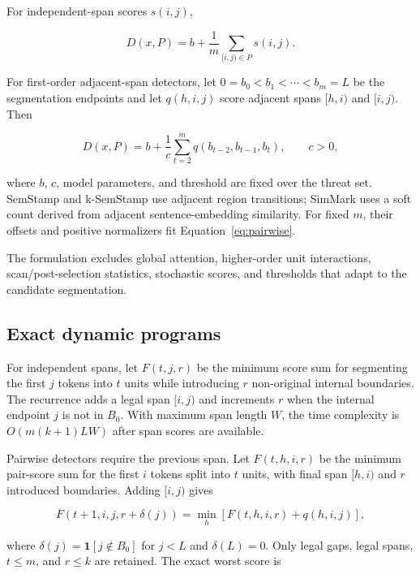 \documentclass[10pt]{article}
\begin{document}
For independent-span scores $s(i,j)$,

\begin{equation}
D(x,P)=b+\frac{1}{m}\sum_{[i,j)\in P}s(i,j).
\end{equation}

For first-order adjacent-span detectors, let
$0=b_0<b_1<\cdots<b_m=L$ be the segmentation endpoints and let
$q(h,i,j)$ score adjacent spans $[h,i)$ and $[i,j)$. Then

\begin{equation}
D(x,P)=b+\frac{1}{c}
\sum_{t=2}^{m}q(b_{t-2},b_{t-1},b_t),\qquad c>0,
\label{eq:pairwise}
\end{equation}

where $b$, $c$, model parameters, and threshold are fixed over the threat set.
SemStamp and k-SemStamp use adjacent region transitions; SimMark uses a soft
count derived from adjacent sentence-embedding similarity. For fixed $m$,
their offsets and positive normalizers fit Equation~\ref{eq:pairwise}.

The formulation excludes global attention, higher-order unit interactions,
scan/post-selection statistics, stochastic scores, and thresholds that adapt
to the candidate segmentation.

\subsection{Exact dynamic programs}

For independent spans, let $F(t,j,r)$ be the minimum score sum for segmenting
the first $j$ tokens into $t$ units while introducing $r$ non-original
internal boundaries. The recurrence adds a legal span $[i,j)$ and increments
$r$ when the internal endpoint $j$ is not in $B_0$. With maximum span length
$W$, the time complexity is $O(m(k+1)LW)$ after span scores are available.

Pairwise detectors require the previous span. Let
$F(t,h,i,r)$ be the minimum pair-score sum for the first $i$ tokens split
into $t$ units, with final span $[h,i)$ and $r$ introduced boundaries.
Adding $[i,j)$ gives

\begin{equation}
F(t+1,i,j,r+\delta(j))
=
\min_h\left[F(t,h,i,r)+q(h,i,j)\right],
\label{eq:dp}
\end{equation}

where $\delta(j)=\mathbf 1[j\notin B_0]$ for $j<L$ and $\delta(L)=0$.
Only legal gaps, legal spans, $t\leq m$, and $r\leq k$ are retained. The exact
worst score is
\end{document}
